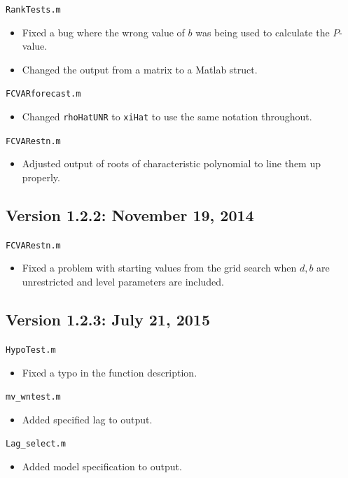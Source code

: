 \documentclass[10pt]{article}
\begin{document}
\noindent \verb|RankTests.m|
\begin{itemize}
\item Fixed a bug where the wrong value of $b$ was being used to calculate the $P$-value.
\item Changed the output from a matrix to a Matlab struct.
\end{itemize}

\noindent \verb|FCVARforecast.m|
\begin{itemize}
\item Changed \verb|rhoHatUNR| to \verb|xiHat| to use the same notation throughout.
\end{itemize}

\noindent \verb|FCVARestn.m|
\begin{itemize}
\item Adjusted output of roots of characteristic polynomial to line them up properly.
\end{itemize}

\subsection{Version 1.2.2: November 19, 2014}

\noindent \verb|FCVARestn.m|
\begin{itemize}
\item Fixed a problem with starting values from the grid search when $d,b$ are unrestricted and level parameters are included.
\end{itemize}

\subsection{Version 1.2.3: July 21, 2015}

\noindent \verb|HypoTest.m|
\begin{itemize}
\item Fixed a typo in the function description.
\end{itemize}

\noindent \verb|mv_wntest.m|
\begin{itemize}
\item Added specified lag to output.
\end{itemize}

\noindent \verb|Lag_select.m|
\begin{itemize}
\item Added model specification to output.
\end{itemize}
\end{document}
